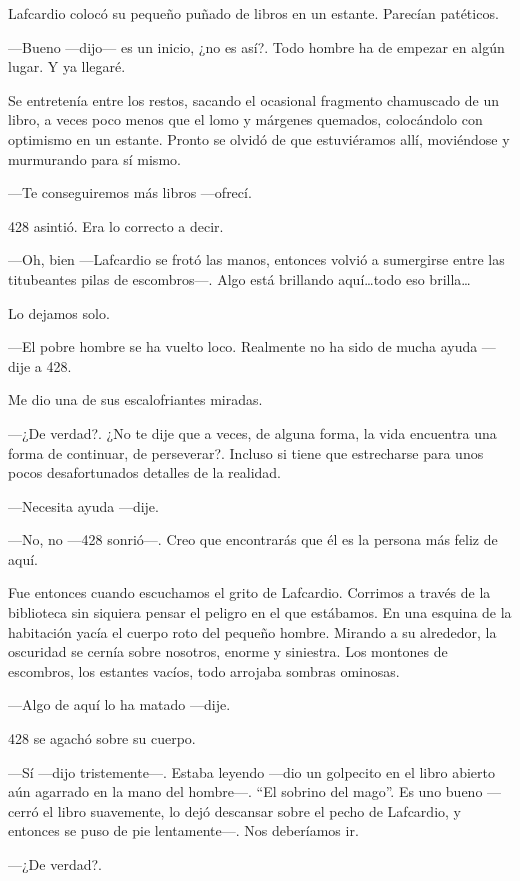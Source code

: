 Lafcardio colocó su pequeño puñado de libros en un estante. Parecían
patéticos.

---Bueno ---dijo--- es un inicio, ¿no es así?. Todo hombre ha de empezar
en algún lugar. Y ya llegaré.

Se entretenía entre los restos, sacando el ocasional fragmento
chamuscado de un libro, a veces poco menos que el lomo y márgenes
quemados, colocándolo con optimismo en un estante. Pronto se olvidó de
que estuviéramos allí, moviéndose y murmurando para sí mismo.

---Te conseguiremos más libros ---ofrecí.

428 asintió. Era lo correcto a decir.

---Oh, bien ---Lafcardio se frotó las manos, entonces volvió a
sumergirse entre las titubeantes pilas de escombros---. Algo está
brillando aquí\ldots{}todo eso brilla\ldots{}

Lo dejamos solo.

---El pobre hombre se ha vuelto loco. Realmente no ha sido de mucha
ayuda ---dije a 428.

Me dio una de sus escalofriantes miradas.

---¿De verdad?. ¿No te dije que a veces, de alguna forma, la vida
encuentra una forma de continuar, de perseverar?. Incluso si tiene que
estrecharse para unos pocos desafortunados detalles de la realidad.

---Necesita ayuda ---dije.

---No, no ---428 sonrió---. Creo que encontrarás que él es la persona
más feliz de aquí.

Fue entonces cuando escuchamos el grito de Lafcardio. Corrimos a través
de la biblioteca sin siquiera pensar el peligro en el que estábamos. En
una esquina de la habitación yacía el cuerpo roto del pequeño hombre.
Mirando a su alrededor, la oscuridad se cernía sobre nosotros, enorme y
siniestra. Los montones de escombros, los estantes vacíos, todo arrojaba
sombras ominosas.

---Algo de aquí lo ha matado ---dije.

428 se agachó sobre su cuerpo.

---Sí ---dijo tristemente---. Estaba leyendo ---dio un golpecito en el
libro abierto aún agarrado en la mano del hombre---. ``El sobrino del
mago''. Es uno bueno ---cerró el libro suavemente, lo dejó descansar
sobre el pecho de Lafcardio, y entonces se puso de pie lentamente---.
Nos deberíamos ir.

---¿De verdad?.

